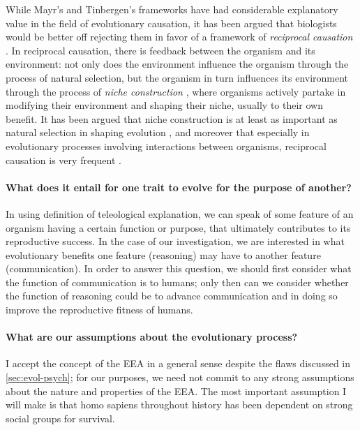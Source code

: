 While Mayr's and Tinbergen's frameworks have had considerable explanatory value in the field of evolutionary causation, it has been argued that biologists would be better off rejecting them in favor of a framework of \emph{reciprocal causation} \citep{Laland13}.
In reciprocal causation, there is feedback between the organism and its environment: not only does the environment influence the organism through the process of natural selection, but the organism in turn influences its environment through the process of \emph{niche construction} \citep{Svensson18}, where organisms actively partake in modifying their environment and shaping their niche, usually to their own benefit. It has been argued that niche construction is at least as important as natural selection in shaping evolution , and moreover that especially in evolutionary processes involving interactions between organisms, reciprocal causation is very frequent \citep{Svensson18}.

\paragraph{What does it entail for one trait to evolve for the purpose of another?}
In using  definition of teleological explanation, we can speak of some feature of an organism having a certain function or purpose, that ultimately contributes to its reproductive success. In the case of our investigation, we are interested in what evolutionary benefits one feature (reasoning) may have to another feature (communication). In order to answer this question, we should first consider what the function of communication is to humans; only then can we consider whether the function of reasoning could be to advance communication and in doing so improve the reproductive fitness of humans.

\paragraph{What are our assumptions about the evolutionary process?}
I accept the concept of the EEA in a general sense despite the flaws discussed in \cref{sec:evol-psych}; for our purposes, we need not commit to any strong assumptions about the nature and properties of the EEA. The most important assumption I will make is that homo sapiens throughout history has been dependent on strong social groups for survival.

